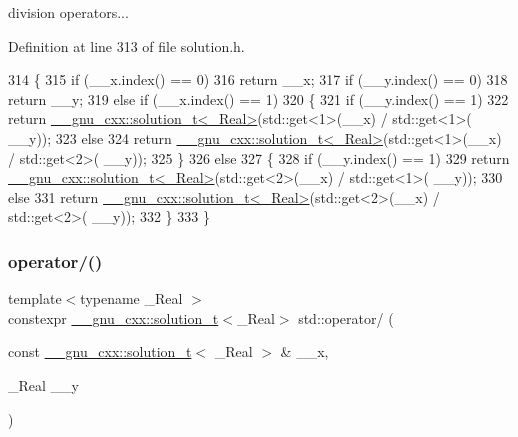 division operators... 

Definition at line 313 of file solution.\+h.


\begin{DoxyCode}
314     \{
315       \textcolor{keywordflow}{if} (\_\_x.index() == 0)
316         \textcolor{keywordflow}{return} \_\_x;
317       \textcolor{keywordflow}{if} (\_\_y.index() == 0)
318         \textcolor{keywordflow}{return} \_\_y;
319       \textcolor{keywordflow}{else} \textcolor{keywordflow}{if} (\_\_x.index() == 1)
320         \{
321           \textcolor{keywordflow}{if} (\_\_y.index() == 1)
322             \textcolor{keywordflow}{return} \hyperlink{namespace____gnu__cxx_ae20ea642de50eb361074c62676b0159c}{\_\_gnu\_cxx::solution\_t<\_Real>}(std::get<1>(\_\_x) / std::get<1>(
      \_\_y));
323           \textcolor{keywordflow}{else}
324             \textcolor{keywordflow}{return} \hyperlink{namespace____gnu__cxx_ae20ea642de50eb361074c62676b0159c}{\_\_gnu\_cxx::solution\_t<\_Real>}(std::get<1>(\_\_x) / std::get<2>(
      \_\_y));
325         \}
326       \textcolor{keywordflow}{else}
327         \{
328           \textcolor{keywordflow}{if} (\_\_y.index() == 1)
329             \textcolor{keywordflow}{return} \hyperlink{namespace____gnu__cxx_ae20ea642de50eb361074c62676b0159c}{\_\_gnu\_cxx::solution\_t<\_Real>}(std::get<2>(\_\_x) / std::get<1>(
      \_\_y));
330           \textcolor{keywordflow}{else}
331             \textcolor{keywordflow}{return} \hyperlink{namespace____gnu__cxx_ae20ea642de50eb361074c62676b0159c}{\_\_gnu\_cxx::solution\_t<\_Real>}(std::get<2>(\_\_x) / std::get<2>(
      \_\_y));
332         \}
333     \}
\end{DoxyCode}
\mbox{\label{namespacestd_a303ec56de26f2f2490f5bbd085ab48f1}} 
\subsubsection{\texorpdfstring{operator/()}{operator/()}\hspace{0.1cm}{\footnotesize\ttfamily [2/5]}}
{\footnotesize\ttfamily template$<$typename \+\_\+\+Real $>$ \\
constexpr \hyperlink{namespace____gnu__cxx_ae20ea642de50eb361074c62676b0159c}{\+\_\+\+\_\+gnu\+\_\+cxx\+::solution\+\_\+t}$<$\+\_\+\+Real$>$ std\+::operator/ (\begin{DoxyParamCaption}\item[{const \hyperlink{namespace____gnu__cxx_ae20ea642de50eb361074c62676b0159c}{\+\_\+\+\_\+gnu\+\_\+cxx\+::solution\+\_\+t}$<$ \+\_\+\+Real $>$ \&}]{\+\_\+\+\_\+x,  }\item[{\+\_\+\+Real}]{\+\_\+\+\_\+y }\end{DoxyParamCaption})}



